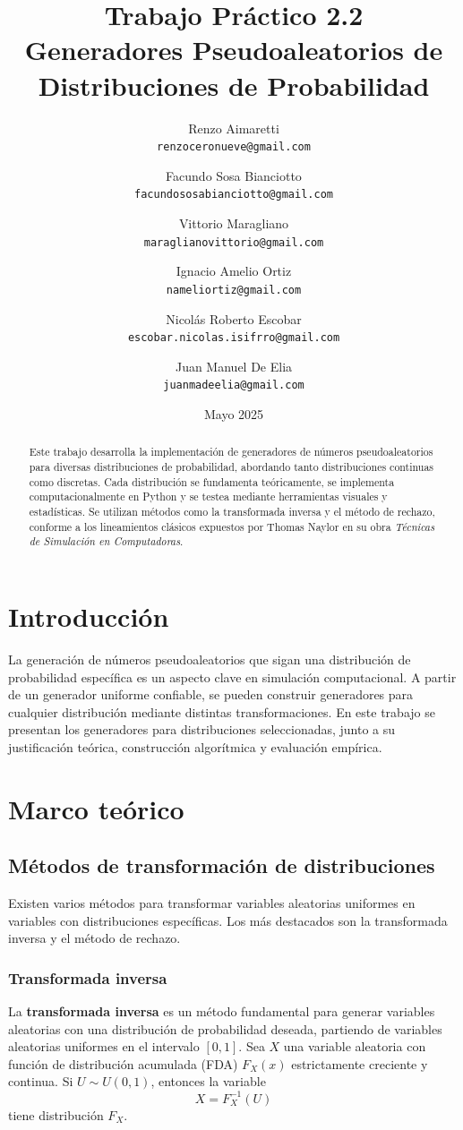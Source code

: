 \documentclass{article}
\title{Trabajo Práctico 2.2 \\
Generadores Pseudoaleatorios de Distribuciones de Probabilidad}
\author{
    Renzo Aimaretti \\ \texttt{renzoceronueve@gmail.com}
    \and
    Facundo Sosa Bianciotto \\ \texttt{facundososabianciotto@gmail.com}
    \and
    Vittorio Maragliano \\ \texttt{maraglianovittorio@gmail.com}
    \and
    Ignacio Amelio Ortiz \\ \texttt{nameliortiz@gmail.com}
    \and
    Nicolás Roberto Escobar \\ \texttt{escobar.nicolas.isifrro@gmail.com}
    \and
    Juan Manuel De Elia \\ \texttt{juanmadeelia@gmail.com}
}
\date{Mayo 2025}
\begin{document}
\maketitle

\begin{abstract}
Este trabajo desarrolla la implementación de generadores de números pseudoaleatorios para diversas distribuciones de probabilidad, abordando tanto distribuciones continuas como discretas. Cada distribución se fundamenta teóricamente, se implementa computacionalmente en Python y se testea mediante herramientas visuales y estadísticas. Se utilizan métodos como la transformada inversa y el método de rechazo, conforme a los lineamientos clásicos expuestos por Thomas Naylor en su obra \textit{Técnicas de Simulación en Computadoras}.
\end{abstract}

\section{Introducción}
La generación de números pseudoaleatorios que sigan una distribución de probabilidad específica es un aspecto clave en simulación computacional. A partir de un generador uniforme confiable, se pueden construir generadores para cualquier distribución mediante distintas transformaciones. En este trabajo se presentan los generadores para distribuciones seleccionadas, junto a su justificación teórica, construcción algorítmica y evaluación empírica.

\section{Marco teórico}

\subsection{Métodos de transformación de distribuciones}

Existen varios métodos para transformar variables aleatorias uniformes en variables con distribuciones específicas. Los más destacados son la transformada inversa y el método de rechazo.

\subsubsection{Transformada inversa}

La \textbf{transformada inversa} es un método fundamental para generar variables aleatorias con una distribución de probabilidad deseada, partiendo de variables aleatorias uniformes en el intervalo $[0,1]$. Sea $X$ una variable aleatoria con función de distribución acumulada (FDA) $F_X(x)$ estrictamente creciente y continua. Si $U \sim U(0,1)$, entonces la variable
\begin{equation}
    X = F_X^{-1}(U)
\end{equation}
tiene distribución $F_X$.
\end{document}

